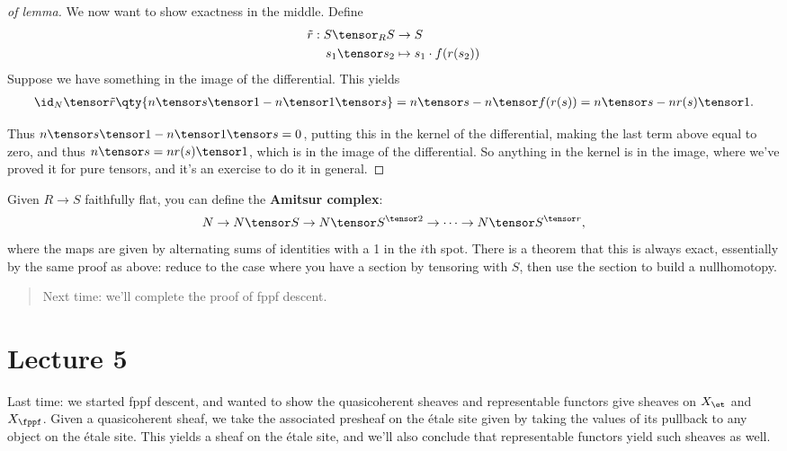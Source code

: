 \begin{proof}[of lemma]
We now want to show exactness in the middle. Define
\begin{align*}
\tilde r: S\tensor_R S &\to S \\
s_1 \tensor s_2 &\mapsto s_1 \cdot f(r(s_2))
\end{align*} Suppose we have something in the image of the differential.
This yields
\begin{align*}  
\id_N \tensor \tilde r \qty{n\tensor s\tensor 1 - n\tensor 1 \tensor s}
= n\tensor s - n\tensor f(r(s))
= n\tensor s - nr(s) \tensor 1
.\end{align*}

Thus \(n\tensor s\tensor 1 - n\tensor 1\tensor s = 0\), putting this in
the kernel of the differential, making the last term above equal to
zero, and thus \(n\tensor s = n r(s) \tensor 1\), which is in the image
of the differential. So anything in the kernel is in the image, where
we've proved it for pure tensors, and it's an exercise to do it in
general.

\end{proof}

\begin{remark}

Given \(R\to S\) faithfully flat, you can define the \textbf{Amitsur
complex}:
\begin{align*}  
N \to N\tensor S \to N\tensor S^{\tensor 2} \to \cdots \to N\tensor S^{\tensor r}
,\end{align*} where the maps are given by alternating sums of identities
with a 1 in the \(i\)th spot. There is a theorem that this is always
exact, essentially by the same proof as above: reduce to the case where
you have a section by tensoring with \(S\), then use the section to
build a nullhomotopy.

\end{remark}

\begin{quote}
Next time: we'll complete the proof of fppf descent.
\end{quote}

\hypertarget{lecture-5}{%
\section{Lecture 5}\label{lecture-5}}

Last time: we started fppf descent, and wanted to show the quasicoherent
sheaves and representable functors give sheaves on \(X_{\et}\) and
\(X_{\fppf}\). Given a quasicoherent sheaf, we take the associated
presheaf on the étale site given by taking the values of its pullback to
any object on the étale site. This yields a sheaf on the étale site, and
we'll also conclude that representable functors yield such sheaves as
well.

